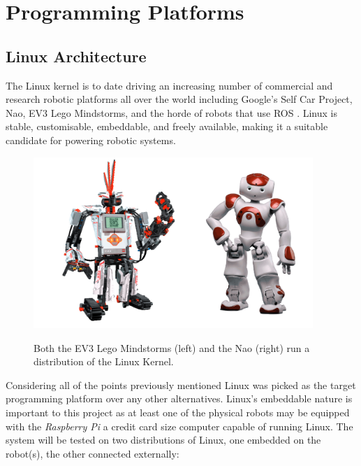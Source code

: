 
\section{Programming Platforms}

\subsection{Linux Architecture}
\noindent
The Linux kernel is to date driving an increasing number of commercial and research robotic platforms all over the world including Google's Self Car Project, Nao, EV3 Lego Mindstorms, and the horde of robots that use ROS \cite{MIT, NAO, EV3, ROS}. Linux is stable, customisable, embeddable, and freely available, making it a suitable candidate for powering robotic systems. \\

\begin{figure}[htbp]

\center \includegraphics[width=300pt]{illustrations/ev3_nao.png}\\
\caption{Both the EV3 Lego Mindstorms (left) and the Nao (right) run a distribution of the Linux Kernel. \cite{EV3, NAO}} 
\label{central thread}

\end{figure}

\noindent
Considering all of the points previously mentioned Linux was picked as the target programming platform over any other alternatives. Linux's embeddable nature is important to this project as at least one of the physical robots may be equipped with the \textit{Raspberry Pi} a credit card size computer capable of running Linux. The system will be tested on two distributions of Linux, one embedded on the robot(s), the other connected externally:

